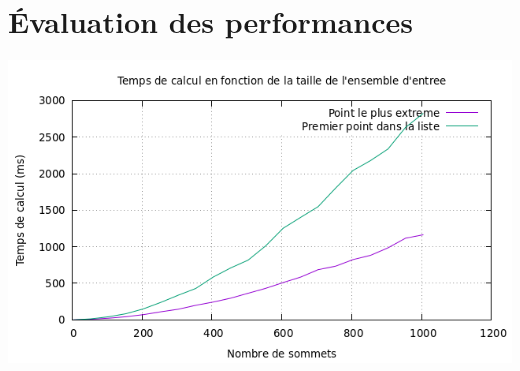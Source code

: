 \documentclass[]{article}
\begin{document}
\section{Évaluation des performances}

\includegraphics[scale=.5]{perf_extreme.png}
	
\end{document}

